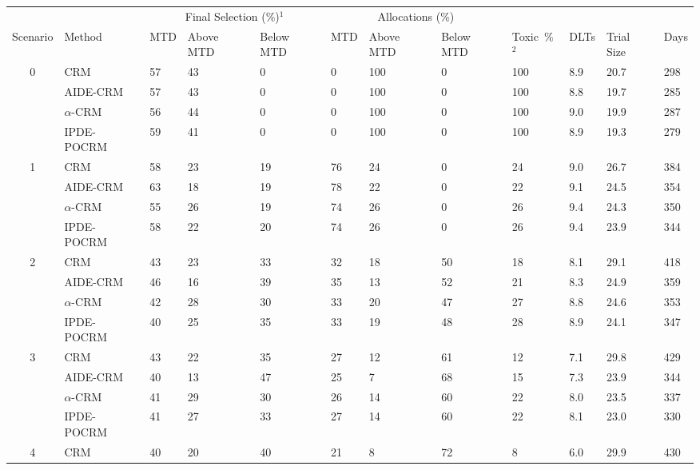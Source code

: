 \begin{tabular*}{\textwidth}{@{\extracolsep\fill}clllllllllll@{\extracolsep\fill}}
\toprule
&  & \multicolumn{3}{c}{Final Selection (\%)$^1$} & \multicolumn{3}{c}{Allocations (\%)} & &  &  &  \\
\multirow{2}{2em}{Scenario} & \multirow{2}{2em}{Method} & \multirow{2}{2em}{MTD} & \multirow{2}{2em}{Above MTD} & \multirow{2}{2em}{Below MTD} & \multirow{2}{2em}{MTD} & \multirow{2}{2em}{Above MTD} & \multirow{2}{2em}{Below MTD} & \multirow{2}{2em}{Toxic~\%$^2$} & \multirow{2}{2em}{DLTs} & \multirow{2}{2em}{Trial Size} & \multirow{2}{2em}{Days}  \\ \\ 
\midrule
\multirow{4}{2em}{0} & CRM & 57 & 43 & 0 & 0 & 100 & 0 & 100 & 8.9 & 20.7 & 298\\
 & AIDE-CRM & 57 & 43 & 0 & 0 & 100 & 0 & 100 & 8.8 & 19.7 & 285\\
 & $\alpha$-CRM & 56 & 44 & 0 & 0 & 100 & 0 & 100 & 9.0 & 19.9 & 287\\
 & IPDE-POCRM & 59 & 41 & 0 & 0 & 100 & 0 & 100 & 8.9 & 19.3 & 279\\
\midrule
\multirow{4}{2em}{1} & CRM & 58 & 23 & 19 & 76 & 24 & 0 & 24 & 9.0 & 26.7 & 384\\
 & AIDE-CRM & 63 & 18 & 19 & 78 & 22 & 0 & 22 & 9.1 & 24.5 & 354\\
 & $\alpha$-CRM & 55 & 26 & 19 & 74 & 26 & 0 & 26 & 9.4 & 24.3 & 350\\
 & IPDE-POCRM & 58 & 22 & 20 & 74 & 26 & 0 & 26 & 9.4 & 23.9 & 344\\
\midrule
\multirow{4}{2em}{2} & CRM & 43 & 23 & 33 & 32 & 18 & 50 & 18 & 8.1 & 29.1 & 418\\
 & AIDE-CRM & 46 & 16 & 39 & 35 & 13 & 52 & 21 & 8.3 & 24.9 & 359\\
 & $\alpha$-CRM & 42 & 28 & 30 & 33 & 20 & 47 & 27 & 8.8 & 24.6 & 353\\
 & IPDE-POCRM & 40 & 25 & 35 & 33 & 19 & 48 & 28 & 8.9 & 24.1 & 347\\
\midrule
\multirow{4}{2em}{3} & CRM & 43 & 22 & 35 & 27 & 12 & 61 & 12 & 7.1 & 29.8 & 429\\
 & AIDE-CRM & 40 & 13 & 47 & 25 & 7 & 68 & 15 & 7.3 & 23.9 & 344\\
 & $\alpha$-CRM & 41 & 29 & 30 & 26 & 14 & 60 & 22 & 8.0 & 23.5 & 337\\
 & IPDE-POCRM & 41 & 27 & 33 & 27 & 14 & 60 & 22 & 8.1 & 23.0 & 330\\
\midrule
\multirow{4}{2em}{4} & CRM & 40 & 20 & 40 & 21 & 8 & 72 & 8 & 6.0 & 29.9 & 430\\

\end{tabular*}
